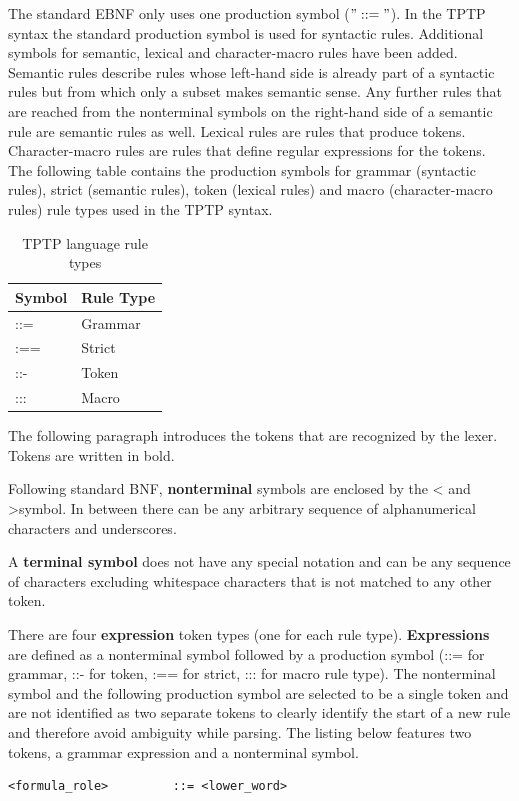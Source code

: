 The standard \ac{EBNF} only uses one production symbol ($"::="$).
In the \ac{TPTP} syntax the standard production symbol is used for syntactic rules.
Additional symbols for semantic, lexical and character-macro rules have been added. Semantic rules describe rules whose left-hand side is already part of a syntactic rules but from which only a subset makes semantic sense. Any further rules that are reached from the nonterminal symbols on the right-hand side of a semantic rule are semantic rules as well. Lexical rules are rules that produce tokens. Character-macro rules are rules that define regular expressions for the tokens.
The following table contains the production symbols for grammar (syntactic rules), strict (semantic rules), token (lexical rules) and macro (character-macro rules) rule types used in the \ac{TPTP} syntax.

\begin{table}[H]
\centering
\caption{\ac{TPTP} language rule types \cite{VS06}}
\begin{tabular}{ll}
\textbf{Symbol} & \textbf{Rule Type}\\\hline
::= & Grammar\\
:== & Strict\\
::- & Token\\
::: & Macro\\
\end{tabular}
\label{tbl:ConceptTPTPProductionSymbols}
\end{table}

The following paragraph introduces the tokens that are recognized by the lexer. Tokens are written in bold.

Following standard \ac{BNF}, \textbf{nonterminal} symbols are enclosed by the \textless\; and \textgreater \;symbol.
In between there can be any arbitrary sequence of alphanumerical characters and underscores.

A \textbf{terminal symbol} does not have any special notation and can be any sequence of characters excluding whitespace characters that is not matched to any other token.

There are four \textbf{expression} token types (one for each rule type).
\textbf{Expressions} are defined as a nonterminal symbol followed by a production symbol (::= for grammar, ::- for token, :== for strict, ::: for macro rule type).
The nonterminal symbol and the following production symbol are selected to be a single token and are not identified as two separate tokens to clearly identify the start of a new rule and therefore avoid ambiguity while parsing.
The listing below features two tokens, a grammar expression and a nonterminal symbol.
\begin{lstlisting}[caption= Rule example]
<formula_role>         ::= <lower_word>
\end{lstlisting}

